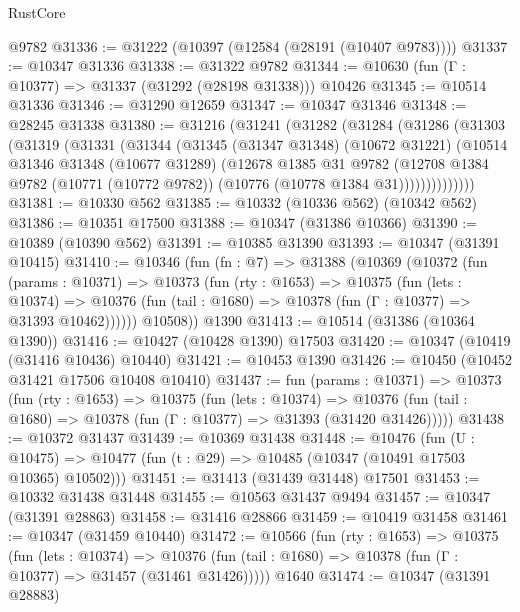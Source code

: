 \begin{lexlean}{RustCore}
\begin{coremodule}
    @9782
@31336 := @31222 (@10397 (@12584 (@28191 (@10407 @9783))))
@31337 := @10347 @31336
@31338 := @31322 @9782
@31344 := @10630 (fun (Γ : @10377) => @31337 (@31292 (@28198 @31338))) @10426
@31345 := @10514 @31336
@31346 := @31290 @12659
@31347 := @10347 @31346
@31348 := @28245 @31338
@31380 := @31216
    (@31241
      (@31282
        (@31284
          (@31286
            (@31303
              (@31319
                (@31331
                  (@31344
                    (@31345
                      (@31347 @31348)
                      (@10672 @31221)
                      (@10514
                        @31346
                        @31348
                        (@10677 @31289)
                        (@12678
                          @1385
                          @31
                          @9782
                          (@12708
                            @1384
                            @9782
                            (@10771 (@10772 @9782))
                            (@10776 (@10778 @1384 @31))))))))))))))
@31381 := @10330 @562
@31385 := @10332 (@10336 @562) (@10342 @562)
@31386 := @10351 @17500
@31388 := @10347 (@31386 @10366)
@31390 := @10389 (@10390 @562)
@31391 := @10385 @31390
@31393 := @10347 (@31391 @10415)
@31410 := @10346
    (fun (fn : @7) =>
    @31388
      (@10369
        (@10372
          (fun (params : @10371) =>
          @10373
            (fun (rty : @1653) =>
            @10375
              (fun (lets : @10374) =>
              @10376 (fun (tail : @1680) => @10378 (fun (Γ : @10377) => @31393 @10462))))))
        @10508))
    @1390
@31413 := @10514 (@31386 (@10364 @1390))
@31416 := @10427 (@10428 @1390) @17503
@31420 := @10347 (@10419 (@31416 @10436) @10440)
@31421 := @10453 @1390
@31426 := @10450 (@10452 @31421 @17506 @10408 @10410)
@31437 := fun (params : @10371) =>
  @10373
    (fun (rty : @1653) =>
    @10375
      (fun (lets : @10374) =>
      @10376 (fun (tail : @1680) => @10378 (fun (Γ : @10377) => @31393 (@31420 @31426)))))
@31438 := @10372 @31437
@31439 := @10369 @31438
@31448 := @10476
    (fun (U : @10475) => @10477 (fun (t : @29) => @10485 (@10347 (@10491 @17503 @10365) @10502)))
@31451 := @31413 (@31439 @31448) @17501
@31453 := @10332 @31438 @31448
@31455 := @10563 @31437 @9494
@31457 := @10347 (@31391 @28863)
@31458 := @31416 @28866
@31459 := @10419 @31458
@31461 := @10347 (@31459 @10440)
@31472 := @10566
    (fun (rty : @1653) =>
    @10375
      (fun (lets : @10374) =>
      @10376 (fun (tail : @1680) => @10378 (fun (Γ : @10377) => @31457 (@31461 @31426)))))
    @1640
@31474 := @10347 (@31391 @28883)

\end{coremodule}
\end{lexlean}

